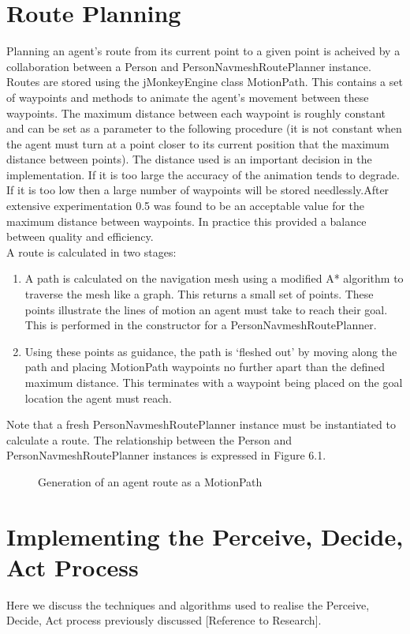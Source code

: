 \documentclass{article}
\begin{document}
\section{Route Planning}
Planning an agent's route from its current point to a given point is acheived by a collaboration between a Person and PersonNavmeshRoutePlanner instance. Routes are stored using the jMonkeyEngine class MotionPath. This contains a set of waypoints and methods to animate the agent's movement between these waypoints. The maximum distance between each waypoint is roughly constant and can be set as a parameter to the following procedure (it is not constant when the agent must turn at a point closer to its current position that the maximum distance between points). The distance used is an important decision in the implementation. If it is too large the accuracy of the animation tends to degrade. If it is too low then a large number of waypoints will be stored needlessly.After extensive experimentation 0.5 was found to be an acceptable value for the maximum distance between waypoints. In practice this provided a balance between quality and efficiency.\\
A route is calculated in two stages:
\begin{enumerate}
\item{A path is calculated on the navigation mesh using a modified A* algorithm to traverse the mesh like a graph. This returns a small set of points. These points illustrate the lines of motion an agent must take to reach their goal. This is performed in the constructor for a PersonNavmeshRoutePlanner.}
\item{Using these points as guidance, the path is `fleshed out' by moving along the path and placing MotionPath waypoints no further apart than the defined maximum
distance. This terminates with a waypoint being placed on the goal location the agent must reach.}
\end{enumerate}
Note that a fresh PersonNavmeshRoutePlanner instance must be instantiated to calculate a route. The relationship between the Person and PersonNavmeshRoutePlanner instances is expressed in Figure 6.1.

\begin{figure}
\centering
{}
\label{fig:RoutePlanSequence}
\caption{Generation of an agent route as a MotionPath \label{fig:RoutePlanSequence}}
\end{figure}


\section{Implementing the Perceive, Decide, Act Process}
Here we discuss the techniques and algorithms used to realise the Perceive, Decide, Act process previously discussed [Reference to Research].
\end{document}
